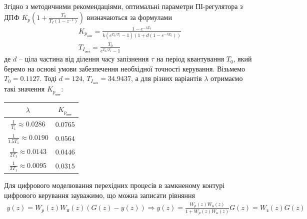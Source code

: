 Згідно з методичними рекомендаціями, оптимальні параметри ПІ-регулятора з ДПФ 
$K_p \left(
    1 + \frac{T_0}{T_I \left(1 - z^{-1}\right)}
\right)$
визначаються за формулами
\begin{gather}\label{K_p_opt__direct}
    K_{p_{\text{опт}}} = \frac{
        1 - e^{-\lambda T_0}
    }{
        k \left(e^{T_0 / T_1} - 1\right) \left(1 + d \left(1 - e^{-\lambda T_0}\right)\right)
    } \\ \label{T_I_opt__direct}
    T_{I_{\text{опт}}} = \frac{T_0}{e^{T_0 / T_1} - 1}
\end{gather}
де $d$ -- ціла частина від ділення часу запізнення $\tau$ на період квантування
$T_0$, який беремо на основі умови забезпечення необхідної точності керування.
Візьмемо $T_0 = 0.1127$. Тоді $d = 124$, $T_{I_{\text{опт}}} = 34.9437$, а для різних варіантів $\lambda$ отримаємо такі значення $K_{p_{\text{опт}}}$:
\begin{center}
    \begin{tabular}{|c|c|}
        \hline
        $\lambda$ & $K_{p_{\text{опт}}}$ \\
        \hline
        $\frac{1}{T_1} \approx 0.0286$      & $0.0765$ \\
        \hline
        $\frac{1}{1.5T_1} \approx 0.0190$   & $0.0564$ \\
        \hline
        $\frac{1}{2T_1} \approx 0.0143$     & $0.0446$ \\
        \hline
        $\frac{1}{3T_1} \approx 0.0095$     & $0.0315$ \\
        \hline
    \end{tabular}
\end{center}
Для цифрового моделювання перехідних процесів в замкненому контурі цифрового керування зауважимо, що
можна записати рівняння
\begin{gather*}
    y(z) = W_p(z) W_{\text{п}}(z) \left(G(z) - y(z)\right) \Rightarrow
    y(z) = \frac{W_p(z) W_{\text{п}}(z)}{1 + W_p(z) W_{\text{п}}(z)} G(z) = W_{\text{з}}(z) G(z)
\end{gather*}
